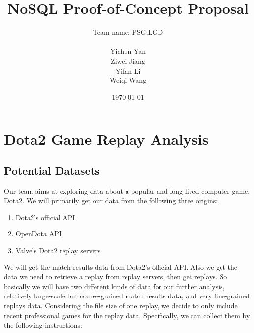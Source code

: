 \documentclass{article}
\title{NoSQL Proof-of-Concept Proposal}
\author{
	Team name: PSG.LGD \\ \\
	Yichun Yan \\
	Ziwei Jiang \\
	Yifan Li \\
	Weiqi Wang
}
\date{\today}
\begin{document}
\maketitle

\tableofcontents
\clearpage


\section{Dota2 Game Replay Analysis}
\subsection{Potential Datasets}
Our team aims at exploring data about a popular and long-lived computer game, Dota2. We will primarily get our data from the following three origins:
\begin{enumerate}
\item \href{https://wiki.teamfortress.com/wiki/WebAPI}{Dota2's official API}
\item \href{https://docs.opendota.com/}{OpenDota API}
\item Valve's Dota2 replay servers
\end{enumerate}
We will get the match results data from Dota2's official API. Also we get the data we need to retrieve a replay from replay servers, then get replays. So basically we will have two different kinds of data for our further analysis, relatively large-scale but coarse-grained match results data, and very fine-grained replays data. Considering the file size of one replay, we decide to only include recent professional games for the replay data. Specifically, we can collect them by the following instructions:
\end{document}
